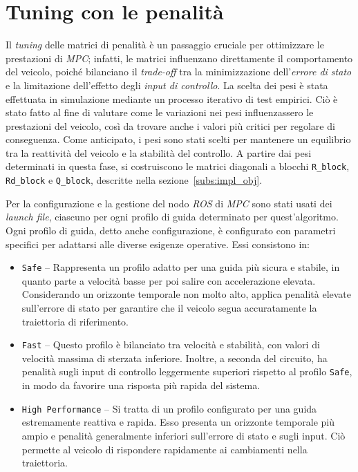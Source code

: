\section{Tuning con le penalità}
\label{subs:tuning}
Il \textit{tuning} delle matrici di penalità è un passaggio cruciale per 
ottimizzare le prestazioni di \textit{MPC}; infatti, le matrici influenzano 
direttamente il comportamento del veicolo, poiché bilanciano il \textit{trade-off} tra la 
minimizzazione dell'\textit{errore di stato} e la limitazione dell'effetto degli \textit{input di controllo}.
La scelta dei pesi è stata effettuata in simulazione mediante un processo 
iterativo di test empirici. Ciò è stato fatto al fine di valutare come le variazioni nei
pesi influenzassero le prestazioni del veicolo, così da trovare anche i valori più critici
per regolare di conseguenza. Come anticipato, i pesi sono stati scelti per mantenere un
equilibrio tra la reattività del veicolo e la stabilità del controllo. 
A partire dai pesi determinati in questa fase, si costruiscono le matrici diagonali a blocchi 
\verb|R_block|, \verb|Rd_block| e \verb|Q_block|, descritte nella sezione~\ref{subs:impl_obj}.

Per la configurazione e la gestione del nodo \textit{ROS} di \textit{MPC} sono stati usati dei 
\textit{launch file}, ciascuno per ogni profilo di guida determinato per quest'algoritmo.
Ogni profilo di guida, detto anche configurazione, è configurato con parametri specifici
per adattarsi alle diverse esigenze operative. Essi consistono in:
\begin{itemize}
    \item \verb|Safe| -- Rappresenta un profilo adatto per una guida 
    più sicura e stabile, in quanto parte a velocità basse per poi salire
    con accelerazione elevata. Considerando un orizzonte temporale non molto alto, applica 
    penalità elevate sull'errore di stato per garantire che il veicolo segua accuratamente la traiettoria di riferimento.
    \item \verb|Fast| -- Questo profilo è bilanciato tra velocità e stabilità, con valori
    di velocità massima di sterzata inferiore. Inoltre, a seconda del circuito, ha penalità
    sugli input di controllo leggermente superiori rispetto al profilo \verb|Safe|, in modo da 
    favorire una risposta più rapida del sistema.
    \item \verb|High Performance| -- Si tratta di un profilo configurato per una guida
    estremamente reattiva e rapida. Esso presenta un orizzonte temporale più ampio e penalità 
    generalmente inferiori sull'errore di stato e sugli input. Ciò permette al veicolo di 
    rispondere rapidamente ai cambiamenti nella traiettoria.
\end{itemize}

